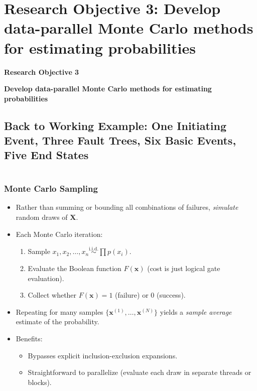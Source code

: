 \section{Research Objective 3: Develop data-parallel Monte Carlo methods for estimating probabilities}
\begin{frame}
    \Large{\centerline{\textbf{Research Objective 3}}}
    \vspace{6pt}
    \large{\centerline{\textbf{Develop data-parallel Monte Carlo methods for estimating probabilities}}}
\end{frame}

\subsection{Back to Working Example: One Initiating Event, Three Fault Trees, Six Basic Events, Five End States}
\begin{frame}
  \begin{columns}
  \end{columns}
\end{frame}


\begin{frame}[t, allowframebreaks]
\frametitle{Monte Carlo Sampling}
\begin{itemize}
  \item Rather than summing or bounding all combinations of failures, \emph{simulate} random draws of \(\mathbf{X}\).
  \item Each Monte Carlo iteration:
    \begin{enumerate}
      \item Sample \(x_1, x_2,\dots,x_n \overset{\text{i.i.d.}}{\sim} \prod p(x_i)\).
      \item Evaluate the Boolean function \(F(\mathbf{x})\) (cost is just logical gate evaluation).
      \item Collect whether \(F(\mathbf{x})=1\) (failure) or 0 (success).
    \end{enumerate}
  \item Repeating for many samples \(\{\mathbf{x}^{(1)}, \dots, \mathbf{x}^{(N)}\}\) yields a \emph{sample average} estimate of the probability.
  \item Benefits:
    \begin{itemize}
      \item Bypasses explicit inclusion-exclusion expansions.
      \item Straightforward to parallelize (evaluate each draw in separate threads or blocks).
    \end{itemize}
\end{itemize}
\end{frame}

